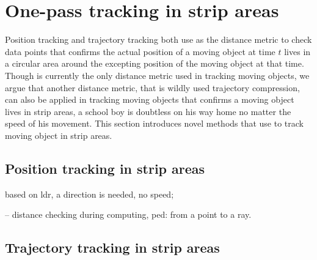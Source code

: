 

\section{One-pass tracking in strip areas}
\label{sec:strip}


Position tracking and trajectory tracking both use \sed as the distance metric to check data points that confirms the actual position of a moving object at time $t$ lives in a circular area around the excepting position of the moving object at that time.
Though \sed is currently the only distance metric used in tracking moving objects, we argue that another distance metric, \ped that is wildly used trajectory compression, can also be applied in tracking moving objects that confirms a moving object lives in strip areas, \eg a school boy is doubtless on his way home no matter the speed of his movement.
This section introduces novel methods that use \ped to track moving object in strip areas.

\subsection{Position tracking in strip areas}
based on ldr, a direction is needed, no speed;
  
  --  distance checking during computing, ped: from a point to a ray.
  



\subsection{Trajectory tracking in strip areas}


